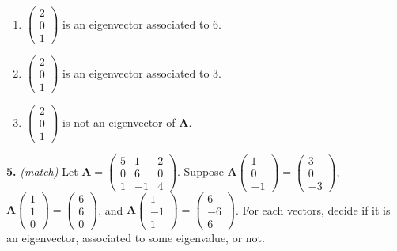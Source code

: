 \documentclass[10pt,a4paper]{article}
\begin{document}
\begin{enumerate}[label=(\Alph*)]
\item \(\begin{pmatrix}2\\0\\1 \end{pmatrix}\) is an eigenvector associated to 6.
\item \(\begin{pmatrix}2\\0\\1 \end{pmatrix}\) is an eigenvector associated to 3.
\item \(\begin{pmatrix}2\\0\\1 \end{pmatrix}\) is not an eigenvector of \(\mathbf{A}\).
\end{enumerate}
\smallskip
\textbf{5.} \textit{(match)} Let \(\mathbf{A}=\begin{pmatrix}5&1&2\\0&6&0\\1&-1&4\end{pmatrix}\). Suppose \(\mathbf{A}\begin{pmatrix}1\\0\\-1\end{pmatrix}=\begin{pmatrix}3\\0\\-3\end{pmatrix}\), \(\mathbf{A}\begin{pmatrix}1\\1\\0\end{pmatrix}=\begin{pmatrix}6\\6\\0\end{pmatrix}\), and \(\mathbf{A}\begin{pmatrix}1\\-1\\1\end{pmatrix}=\begin{pmatrix}6\\-6\\6\end{pmatrix}\). For each vectors, decide if it is an eigenvector, associated to some eigenvalue, or not.
\end{document}

